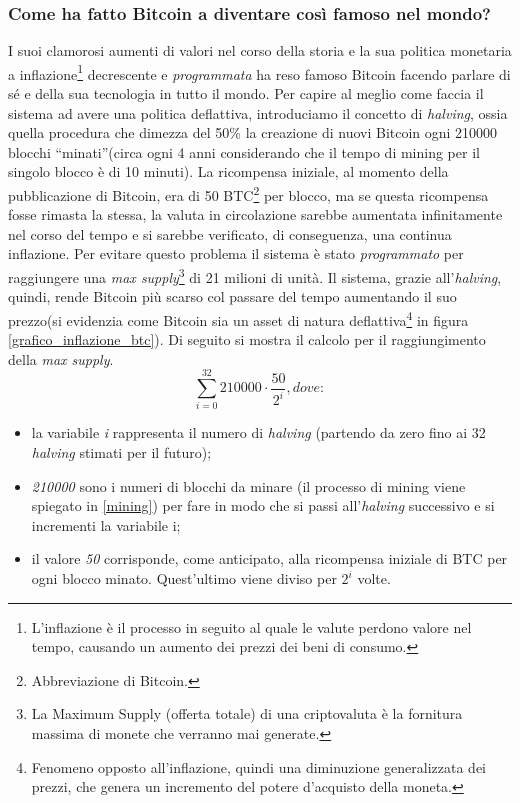 \subsubsection{Come ha fatto Bitcoin a diventare così famoso nel mondo?}
I suoi clamorosi aumenti di valori nel corso della storia e la sua politica monetaria a inflazione\footnote{L'inflazione è il processo in seguito al quale le valute perdono valore nel tempo, causando un aumento dei prezzi dei beni di consumo.} decrescente e \textit{programmata} ha reso famoso Bitcoin facendo parlare di sé e della sua tecnologia in tutto il mondo.
Per capire al meglio come faccia il sistema ad avere una politica deflattiva, introduciamo il concetto di \textit{halving}, ossia quella procedura che dimezza del 50\% la creazione di nuovi Bitcoin ogni 210000 blocchi “minati”(circa ogni 4 anni considerando che il tempo di mining per il singolo blocco è di 10 minuti). La ricompensa iniziale, al momento della pubblicazione di Bitcoin, era di 50 BTC\footnote{Abbreviazione di Bitcoin.} per blocco, ma se questa ricompensa fosse rimasta la stessa, la valuta in circolazione sarebbe aumentata infinitamente nel corso del tempo e si sarebbe verificato, di conseguenza, una continua inflazione. Per evitare questo problema il sistema è stato \textit{programmato} per raggiungere una \textit{max supply}\footnote{La Maximum Supply (offerta totale) di una criptovaluta è la fornitura massima di monete che verranno mai generate.} di 21 milioni di unità.
Il sistema, grazie all'\textit{halving}, quindi, rende Bitcoin più scarso col passare del tempo aumentando il suo prezzo(si evidenzia come Bitcoin sia un asset di natura deflattiva\footnote{Fenomeno opposto all'inflazione, quindi una diminuzione generalizzata dei prezzi, che genera un incremento del potere d'acquisto della moneta.} in figura \ref{grafico_inflazione_btc}). Di seguito si mostra il calcolo per il raggiungimento della \textit{max supply}.
\begin{equation*}
\sum\limits_{i=0}^{32}  210000 \cdot \frac{50}{2^i}       ,dove:
\end{equation*}
\begin{itemize}
\item la variabile \textit{i} rappresenta il numero di \textit{halving} (partendo da zero fino ai 32 \textit{halving} stimati per il futuro);
\item \textit{210000} sono i numeri di blocchi da minare (il processo di mining viene spiegato in \ref{mining}) per fare in modo che si passi all'\textit{halving} successivo e si incrementi la variabile i;
\item il valore \textit{50} corrisponde, come anticipato, alla ricompensa iniziale di BTC per ogni blocco minato. Quest'ultimo viene diviso per \textit{$2^i$} volte.
\end{itemize}

